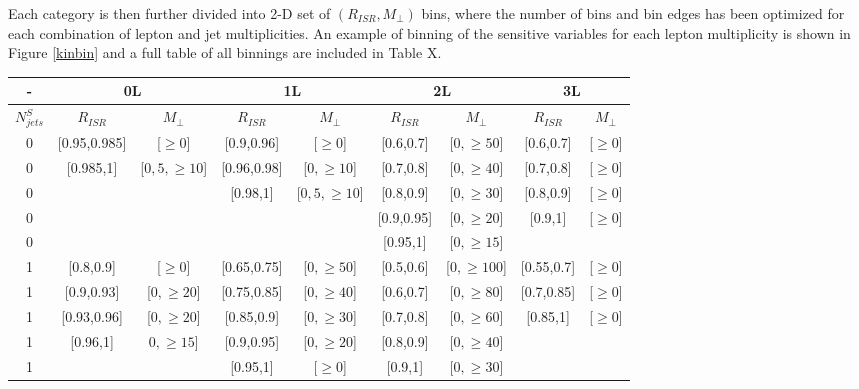 Each category is then further divided into 2-D set of $(R_{ISR}, M_\perp)$ bins, where the number of bins and bin edges has been optimized for each combination of lepton and jet multiplicities. An example of binning of the sensitive variables for each lepton multiplicity is shown in Figure \ref{kinbin} and a full table of all binnings are included in Table X.

\begin{table}
\begin{adjustwidth}{-0.5in}{-1in}
\begin{tabular}{c|cc|cc|cc|cc|}
- & \multicolumn{2}{c}{0L} & \multicolumn{2}{c}{1L} & \multicolumn{2}{c}{2L} & \multicolumn{2}{c}{3L}   \\
\hline
$N_{jets}^S$ & $R_{ISR}$ & $M_\perp$ & $R_{ISR}$ & $M_\perp$ & $R_{ISR}$ & $M_\perp$ & $R_{ISR}$ & $M_\perp$ \\
\hline
0 & [0.95,0.985] & [$\geq 0$]  &[0.9,0.96] & [$\geq 0$]  &[0.6,0.7] & [$0,\geq 50$]  &[0.6,0.7] & [$\geq 0$]  \\
0 & [0.985,1] & [$0,5,\geq 10$]  &[0.96,0.98] & [$0,\geq 10$]  & [0.7,0.8]  & [$0,\geq 40$] &[0.7,0.8] & [$\geq 0$]  \\
0 &  &  &[0.98,1] & [$0,5,\geq 10$]  &  [0.8,0.9]  & [$0,\geq 30$] &[0.8,0.9] & [$\geq 0$]  \\
0 &  &   &        &                &[0.9,0.95] &  [$0,\geq 20$]  &[0.9,1] & [$\geq 0$]  \\
0 &   &   &   &   & [0.95,1] & [$0,\geq 15$]  & &   \\
\hline
1 & [0.8,0.9] & [$\geq 0$]  &[0.65,0.75] & [$0,\geq 50$]  &[0.5,0.6] & [$0,\geq 100$]  &[0.55,0.7] & [$\geq 0$]  \\
1 & [0.9,0.93] & [$0,\geq 20$]  &[0.75,0.85] & [$0,\geq 40$]  &[0.6,0.7] & [$0,\geq 80$]  &[0.7,0.85] & [$\geq 0$]  \\
1 & [0.93,0.96] & [$0,\geq 20$]  & [0.85,0.9] & [$0,\geq 30$] &[0.7,0.8]  & [$0,\geq 60$]  &[0.85,1] & [$\geq 0$]  \\
1 & [0.96,1] & $0,\geq 15$]   &[0.9,0.95] & [$0,\geq 20$]   &[0.8,0.9] & [$0,\geq 40$]   & &   \\
1 &  &   &[0.95,1]   & [$\geq 0$]   &[0.9,1]& [$0,\geq 30$]   & &   \\

\end{tabular}
\end{adjustwidth}
\end{table}
